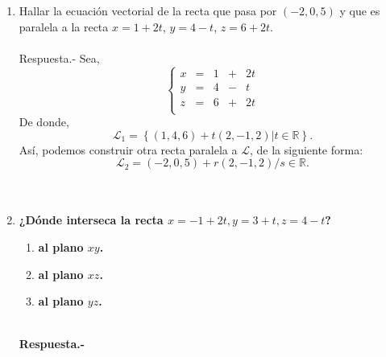 \begin{enumerate}
	
    \item Hallar la ecuación vectorial de la recta que pasa por $(-2,0,5)$ y que es paralela a la recta $x=1+2t$, $y=4-t$, $z=6+2t$.\\\\
	Respuesta.-\; Sea, 
	$$\left\{\begin{array}{rcrcr}
		x&=&1&+&2t\\
		y&=&4&-&t\\
		z&=&6&+&2t\\
	\end{array}\right.$$
De donde,
$$\mathscr{L}_1 = \left\{(1,4,6)+t(2,-1,2)|t\in \mathbb{R}\right\}.$$ 
Así, podemos construir otra recta paralela a $\mathscr{L}$, de la siguiente forma:
$$\mathscr{L}_2 = {(-2,0,5)+r(2,-1,2)/s\in \mathbb{R}}.$$\\\\


    \item \textbf{\boldmath ¿Dónde interseca la recta $x=-1+2t,y=3+t,z=4-t$?}
	\begin{enumerate}[\bfseries a)]
	    \item \textbf{\boldmath al plano $xy$.}
	    \item \textbf{\boldmath al plano $xz$.}
	    \item \textbf{\boldmath al plano $yz$.}\\\\
	\end{enumerate}
	\textbf{Respuesta.-}\; 



\end{enumerate}
